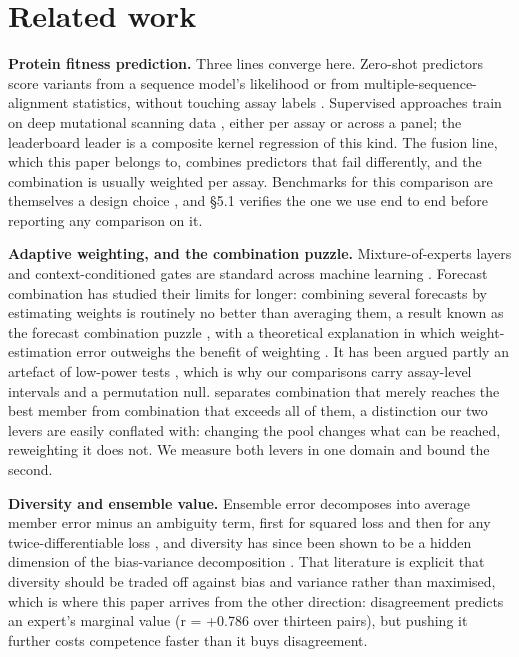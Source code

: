 \documentclass{article}
\begin{document}
\section{Related work}\label{related-work}

\textbf{Protein fitness prediction.} Three lines converge here. Zero-shot predictors score variants from a
sequence model's likelihood or from multiple-sequence-alignment statistics, without touching assay labels
\cite{esm1v,rives2021esm1b,tranception,msatransformer}. Supervised approaches train on deep mutational scanning data
\cite{fowler2014,yang2019}, either per assay or across a panel; the leaderboard leader is a composite
kernel regression of this kind. The fusion line, which this paper belongs to, combines predictors that
fail differently, and the combination is usually weighted per assay. Benchmarks for this comparison are
themselves a design choice \cite{flip,didi2026flip2,tan2026harness,ma2026linear}, and §5.1 verifies the one we use end to end before
reporting any comparison on it.

\textbf{Adaptive weighting, and the combination puzzle.} Mixture-of-experts layers and context-conditioned gates are
standard across machine learning \cite{jacobs1991,shazeer2017,fedus2022switch}. Forecast combination has studied their limits for
longer: combining several forecasts by estimating weights is routinely no better than averaging them, a result
known as the forecast combination puzzle \cite{timmermann2006forecast}, with a theoretical explanation in which
weight-estimation error outweighs the benefit of weighting \cite{claeskens2016forecast}.
It has been argued partly an artefact of low-power tests \cite{frazier2023solving}, which is why our comparisons
carry assay-level intervals and a permutation null. \cite{qian2019forecast} separates combination that merely reaches the best member from
combination that exceeds all of them, a distinction our two levers are easily conflated with: changing the pool
changes what can be reached, reweighting it does not. We measure both levers in one domain and bound the second.

\textbf{Diversity and ensemble value.} Ensemble error decomposes into average member error minus an ambiguity term, first
for squared loss and then for any twice-differentiable loss \cite{audhkhasi2013generalized}, and diversity has since
been shown to be a hidden dimension of the bias-variance decomposition \cite{wood2023unified}. That literature is
explicit that diversity should be traded off against bias and variance rather than maximised, which is where this
paper arrives from the other direction: disagreement predicts an expert's marginal value (r = +0.786 over thirteen pairs), but pushing
it further costs competence faster than it buys disagreement.
\end{document}
